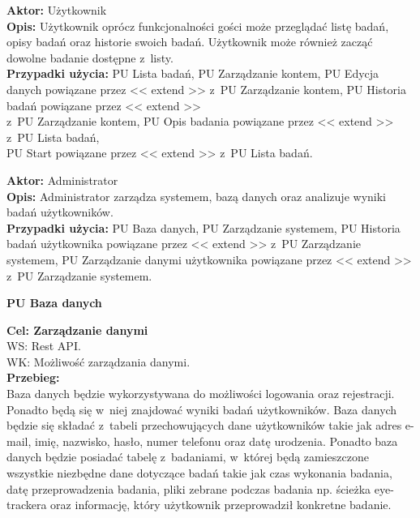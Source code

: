 \documentclass[12pt, letterpaper]{article}
\begin{document}
		\vspace{1cm}
		
		\textbf{Aktor:} Użytkownik\\
		
		\textbf{Opis:} Użytkownik oprócz funkcjonalności gości może przeglądać listę badań, opisy badań oraz historie swoich badań. Użytkownik może również zacząć dowolne badanie dostępne z~listy.\\
		
		\textbf{Przypadki użycia:} PU Lista badań, PU Zarządzanie kontem, PU Edycja danych powiązane przez << extend >> z~PU Zarządzanie kontem, PU Historia badań powiązane przez << extend >>\\ z~PU Zarządzanie kontem, PU Opis badania powiązane przez << extend >> z~PU Lista badań,\\ PU Start powiązane przez << extend >> z~PU Lista badań. 
		
		\vspace{1cm}
		
		\textbf{Aktor:} Administrator\\
		
		\textbf{Opis:} Administrator zarządza systemem, bazą danych oraz analizuje wyniki badań użytkowników.\\
		
		\textbf{Przypadki użycia:} PU Baza danych, PU Zarządzanie systemem, PU Historia badań użytkownika powiązane przez << extend >> z~PU Zarządzanie systemem, PU Zarządzanie danymi użytkownika powiązane przez << extend >> z~PU Zarządzanie systemem.	
		
		\newpage
		
		
		\textbf{PU Baza danych}
		
		\quad
		
		\textbf{Cel: Zarządzanie danymi}\\
		
		WS: Rest API.\\
		
		WK: Możliwość zarządzania danymi.\\
		
		\textbf{Przebieg: }\\
		Baza danych będzie wykorzystywana do możliwości logowania oraz rejestracji. Ponadto będą się w~niej znajdować wyniki badań użytkowników. Baza danych będzie się składać z~tabeli przechowujących dane użytkowników takie jak adres e-mail, imię, nazwisko, hasło, numer telefonu oraz datę urodzenia. Ponadto baza danych będzie posiadać tabelę z~badaniami, w~której będą zamieszczone wszystkie niezbędne dane dotyczące badań takie jak czas wykonania badania, datę przeprowadzenia badania, pliki zebrane podczas badania np. ścieżka eye-trackera oraz informację, który użytkownik przeprowadził konkretne badanie.
		 \\
		
\end{document}
